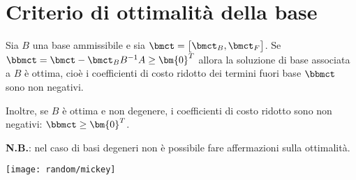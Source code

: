 \documentclass[\main/main.tex]{subfiles}
\begin{document}
\section{Criterio di ottimalità della base}
\begin{minipage}{\textwidth}
  \begin{minipage}{.83\textwidth}
    \flushleft
    \begin{theorem}
      Sia $B$ una base ammissibile e sia $\bmct = \begin{bmatrix}
          \bmct_B, \bmct_F
        \end{bmatrix}$. Se $\bbmct = \bmct - \bmct_B B^{-1}A\geq \bm{0}^T$ allora la soluzione di base associata a $B$ è ottima, cioè i coefficienti di costo ridotto dei termini fuori base $\bbmct$ sono non negativi.

      Inoltre, se $B$ è ottima e non degenere, i coefficienti di costo ridotto sono non negativi: $\bbmct\geq\bm{0}^T$.

      \textbf{N.B.}: nel caso di basi degeneri non è possibile fare affermazioni sulla ottimalità.
    \end{theorem}
  \end{minipage}\hfill
  \begin{minipage}{0.15\textwidth}\center
    \texttt{[image: random/mickey]}
  \end{minipage}
\end{minipage}
\end{document}
